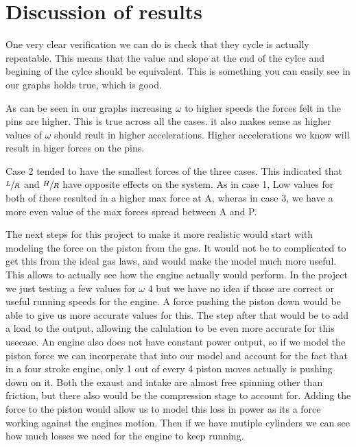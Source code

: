 \documentclass[nofoot,pdf-a,balance,colorlinks,upint,subscriptcorrection,varvw,mathalfa=cal=boondoxo]{asmeconf}
\begin{document}
	\section{Discussion of results}
	One very clear verification we can do is check that they cycle is actually repeatable. This means that the value and slope at the end of the cylce and begining of the cylce should be equivalent. This is something you can easily see in our graphs holds true, which is good. 


	As can be seen in our graphs increasing $\omega$ to higher speeds the forces felt in the pins are higher. This is true across all the cases. it also makes sense as higher values of $\omega$ should reult in higher accelerations. Higher accelerations we know will result in higer forces on the pins.

	Case 2 tended to have the smallest forces of the three cases. This indicated that $\sfrac{L}{R}$ and $\sfrac{H}{R}$ have opposite effects on the system. As in case 1, Low values for both of these resulted in a higher max force at A, wheras in case 3, we have a more even value of the max forces spread between A and P.

	The next steps for this project to make it more realistic would start with modeling the force on the piston from the gas. It would not be to complicated to get this from the ideal gas laws, and would make the model much more useful. This allows to actually see how the engine actually would perform. In the project we just testing a few values for $\omega$ 4 but we have no idea if those are correct or useful running speeds for the engine. A force pushing the piston down would be able to give us more accurate values for this. The step after that would be to add a load to the output, allowing the calulation to be even more accurate for this usecase. An engine also does not have constant power output, so if we model the piston force we can incorperate that into our model and account for the fact that in a four stroke engine, only 1 out of every 4 piston moves actually is pushing down on it. Both the exaust and intake are almost free spinning other than friction, but there also would be the compression stage to account for. Adding the force to the piston would allow us to model this loss in power as its a force working against the engines motion. Then if we have mutiple cylinders we can see how much losses we need for the engine to keep running. 


    \appendix
\end{document}
